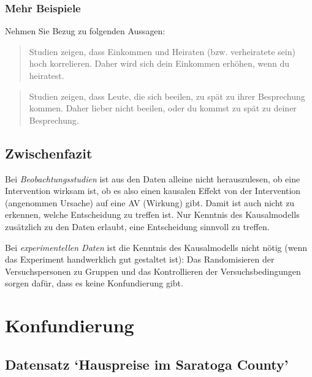 \documentclass[
  a4paper,
  DIV=11]{scrreprt}
\theoremstyle{definition}
\theoremstyle{remark}
\begin{document}
\hypertarget{mehr-beispiele}{%
\subsubsection{Mehr Beispiele}\label{mehr-beispiele}}

Nehmen Sie Bezug zu folgenden Aussagen:

\begin{quote}
Studien zeigen, dass Einkommen und Heiraten (bzw. verheiratete sein)
hoch korrelieren. Daher wird sich dein Einkommen erhöhen, wenn du
heiratest.
\end{quote}

\begin{quote}
Studien zeigen, dass Leute, die sich beeilen, zu spät zu ihrer
Besprechung kommen. Daher lieber nicht beeilen, oder du kommst zu spät
zu deiner Besprechung.
\end{quote}

\hypertarget{zwischenfazit}{%
\subsection{Zwischenfazit}\label{zwischenfazit}}

Bei \emph{Beobachtungsstudien} ist aus den Daten alleine nicht
herauszulesen, ob eine Intervention wirksam ist, ob es also einen
kausalen Effekt von der Intervention (angenommen Ursache) auf eine AV
(Wirkung) gibt. Damit ist auch nicht zu erkennen, welche Entscheidung zu
treffen ist. Nur Kenntnis des Kausalmodells zusätzlich zu den Daten
erlaubt, eine Entscheidung sinnvoll zu treffen.

Bei \emph{experimentellen Daten} ist die Kenntnis des Kausalmodells
nicht nötig (wenn das Experiment handwerklich gut gestaltet ist): Das
Randomisieren der Versuchspersonen zu Gruppen und das Kontrollieren der
Versuchsbedingungen sorgen dafür, dass es keine Konfundierung gibt.

\hypertarget{konfundierung}{%
\section{Konfundierung}\label{konfundierung}}

\newcommand{\indep}{\perp \!\!\! \perp}

\hypertarget{datensatz-hauspreise-im-saratoga-county}{%
\subsection{Datensatz `Hauspreise im Saratoga
County'}\label{datensatz-hauspreise-im-saratoga-county}}
\end{document}
